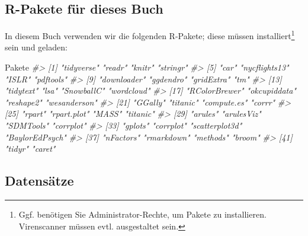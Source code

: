 \documentclass[12pt,ngerman,]{book}
\newenvironment{Shaded}{\begin{snugshade}}{\end{snugshade}}
\newcommand{\CommentTok}[1]{\textcolor[rgb]{0.56,0.35,0.01}{\textit{{#1}}}}
\newcommand{\NormalTok}[1]{{#1}}
\let\rmarkdownfootnote\footnote%
\def\footnote{\protect\rmarkdownfootnote}
\renewenvironment{Shaded}{\begin{kframe}}{\end{kframe}}
\begin{document}
\subsection{R-Pakete für dieses Buch}\label{r-pakete-fur-dieses-buch}

In diesem Buch verwenden wir die folgenden R-Pakete; diese müssen
installiert\footnote{Ggf. benötigen Sie Administrator-Rechte, um Pakete
  zu installieren. Virenscanner müssen evtl. ausgestaltet sein.} sein
und geladen:

\begin{Shaded}
\begin{Highlighting}[]
\NormalTok{Pakete }
\CommentTok{#>  [1] "tidyverse"     "readr"         "knitr"         "stringr"      }
\CommentTok{#>  [5] "car"           "nycflights13"  "ISLR"          "pdftools"     }
\CommentTok{#>  [9] "downloader"    "ggdendro"      "gridExtra"     "tm"           }
\CommentTok{#> [13] "tidytext"      "lsa"           "SnowballC"     "wordcloud"    }
\CommentTok{#> [17] "RColorBrewer"  "okcupiddata"   "reshape2"      "wesanderson"  }
\CommentTok{#> [21] "GGally"        "titanic"       "compute.es"    "corrr"        }
\CommentTok{#> [25] "rpart"         "rpart.plot"    "MASS"          "titanic"      }
\CommentTok{#> [29] "arules"        "arulesViz"     "SDMTools"      "corrplot"     }
\CommentTok{#> [33] "gplots"        "corrplot"      "scatterplot3d" "BaylorEdPsych"}
\CommentTok{#> [37] "nFactors"      "rmarkdown"     "methods"       "broom"        }
\CommentTok{#> [41] "tidyr"         "caret"}
\end{Highlighting}
\end{Shaded}

\subsection{Datensätze}\label{daten}
\end{document}
